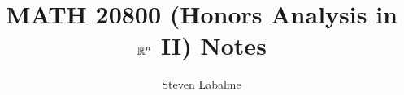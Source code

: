 \documentclass{report}
\title{MATH 20800 (Honors Analysis in $\mathbb{R}^n$ II) Notes}
\author{Steven Labalme}
\begin{document}
\maketitle



\tableofcontents
\newpage



\pagestyle{main}
\renewcommand{\chaptermark}[1]{\markboth{Chapter 1 (The Algebra and Topology of $\R^n$)}{}}


\renewcommand{\chaptermark}[1]{\markboth{\chaptername\ \thechapter\ (#1)}{}}


\printbibliography[heading=bibintoc]
\end{document}
